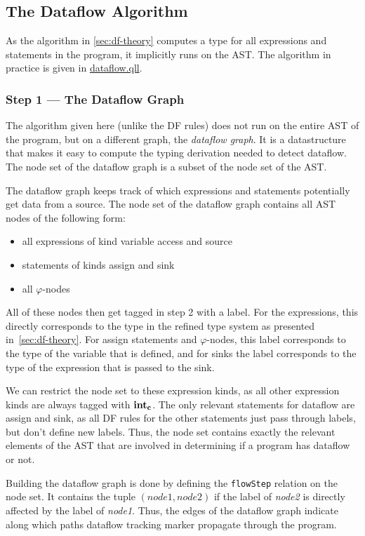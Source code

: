 \subsection{The Dataflow Algorithm}
As the algorithm in \autoref{sec:df-theory} computes a type for all expressions and statements in the program,
it implicitly runs on the AST.
The algorithm in practice is given in \hyperref[lst:dataflow]{dataflow.qll}.

\subsubsection*{Step 1 --- The Dataflow Graph}
The algorithm given here (unlike the DF rules) does not run on the entire AST of the program,
but on a different graph, the \emph{dataflow graph}.
It is a datastructure that makes it easy to compute the typing derivation needed to
detect dataflow.
The node set of the dataflow graph is a subset of the node set of the AST.

The dataflow graph keeps track of which expressions and statements potentially get data from a source.
The node set of the dataflow graph contains all AST nodes of the following form:
\begin{itemize}
    \item all expressions of kind variable access and source
    \item statements of kinds assign and sink
    \item all $\varphi$-nodes
\end{itemize}

All of these nodes then get tagged in step 2 with a label.
For the expressions, this directly corresponds to the type in the refined type system
as presented in~\autoref{sec:df-theory}.
For assign statements and $\varphi$-nodes, this label corresponds to the type of 
the variable that is defined, and for sinks the label corresponds to the type
of the expression that is passed to the sink.

We can restrict the node set to these expression kinds, as all other expression kinds
are always tagged with $\textbf{int}_\textbf{c}$.
The only relevant statements for dataflow are assign and sink, as all DF rules for the 
other statements just pass through labels, but don't define new labels.
Thus, the node set contains  exactly the relevant elements of the AST that are involved in determining
if a program has dataflow or not.

Building the dataflow graph is done by defining the \texttt{flowStep} relation on the node set.
It contains the tuple $(\textit{node1}, \textit{node2})$ if the label of \textit{node2} is directly affected
by the label of \textit{node1}.
Thus, the edges of the dataflow graph indicate along which paths dataflow tracking marker propagate
through the program.

